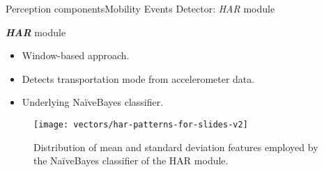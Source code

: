 

\begin{frame}{Perception components}{Mobility Events Detector: \emph{HAR} module}
\small
\begin{block}{\small \emph{\textbf{HAR}} module}
\begin{itemize}
    \item Window-based approach.
    \item Detects transportation mode from accelerometer data.
    \item Underlying NaïveBayes classifier.
\end{itemize}
\end{block}

\begin{figure}
  \centering
  \texttt{[image: vectors/har-patterns-for-slides-v2]}
  \caption{Distribution of mean and standard deviation features employed by the NaïveBayes classifier of the HAR module.}
\end{figure}
\end{frame}

